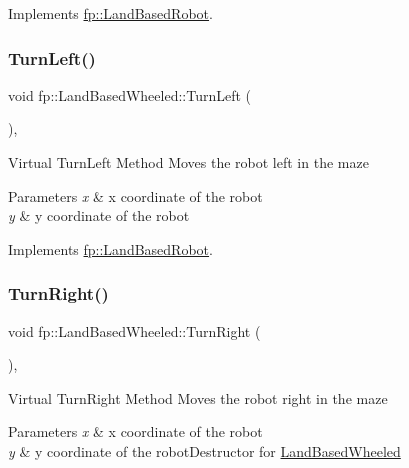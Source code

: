 Implements \hyperlink{classfp_1_1_land_based_robot_a370d28ef28553e8e7a56b1ea68884bb0}{fp\+::\+Land\+Based\+Robot}.

\mbox{\label{classfp_1_1_land_based_wheeled_a240c5e9cf72006ac2f99f8e1dfc4dc5d}} 
\subsubsection{\texorpdfstring{Turn\+Left()}{TurnLeft()}}
{\footnotesize\ttfamily void fp\+::\+Land\+Based\+Wheeled\+::\+Turn\+Left (\begin{DoxyParamCaption}{ }\end{DoxyParamCaption})\hspace{0.3cm}{\ttfamily [override]}, {\ttfamily [virtual]}}

Virtual Turn\+Left Method Moves the robot left in the maze 
\begin{DoxyParams}{Parameters}
{\em x} & x coordinate of the robot \\
\hline
{\em y} & y coordinate of the robot \\
\hline
\end{DoxyParams}


Implements \hyperlink{classfp_1_1_land_based_robot_acd135f01e40d4f2e32739156b56c722f}{fp\+::\+Land\+Based\+Robot}.

\mbox{\label{classfp_1_1_land_based_wheeled_a505f5c33f04681aa5c7362531947f4ca}} 
\subsubsection{\texorpdfstring{Turn\+Right()}{TurnRight()}}
{\footnotesize\ttfamily void fp\+::\+Land\+Based\+Wheeled\+::\+Turn\+Right (\begin{DoxyParamCaption}{ }\end{DoxyParamCaption})\hspace{0.3cm}{\ttfamily [override]}, {\ttfamily [virtual]}}

Virtual Turn\+Right Method Moves the robot right in the maze 
\begin{DoxyParams}{Parameters}
{\em x} & x coordinate of the robot \\
\hline
{\em y} & y coordinate of the robot\+Destructor for \hyperlink{classfp_1_1_land_based_wheeled}{Land\+Based\+Wheeled} \\
\hline
\end{DoxyParams}


